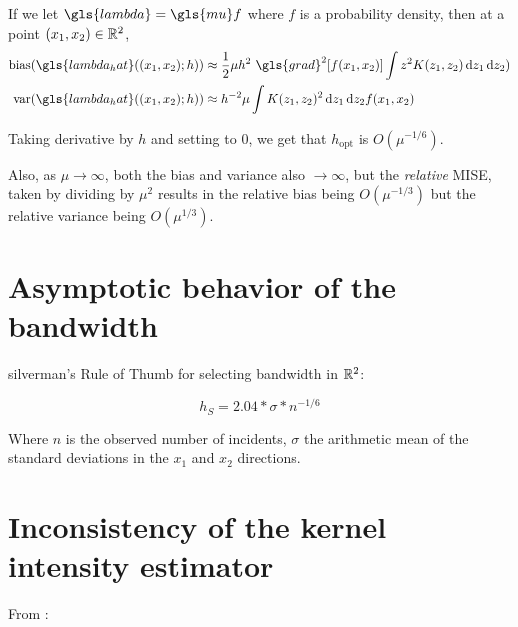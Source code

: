 If we let $\gls{lambda} = \gls{mu} f$ where $f$ is a probability density, then at a point $(x_1, x_2) \in \mathbb{R}^2$,
\begin{align}
    \mbox{bias}(\gls{lambda_hat}(\xvec;h)) & \approx
        \frac{1}{2} \mu h^2 ~ \gls{grad}^2\!\left[ f\xvec \right]
            \int { z^2 K(z_1, z_2) \diff{z_1} \diff{z_2)} } \\
    \mbox{var}(\gls{lambda_hat}(\xvec;h)) & \approx
        h^{-2} \mu
            \int { K(z_1, z_2)^2\diff{z_1} \diff{z_2} } f\xvec
\end{align}

Taking derivative by $h$ and setting to $0$, we get that $h_{\mbox{opt}}$ is $O(\mu^{-1/6})$.

Also, as $\mu \to \infty$, both the bias and variance also $\to \infty$,
but the \textit{relative} MISE, taken by dividing by $\mu^2$ results in the relative bias being $O(\mu^{-1/3})$
but the relative variance being $O(\mu^{1/3})$.

\section{Asymptotic behavior of the bandwidth}
\label{sec:theory:asymptotic_bandwidth}

\Gls{silverman}'s Rule of Thumb for selecting bandwidth in $\mathbb{R}^2$:

\begin{equation}
\label{eq:silverman}
    h_S = 2.04 * \sigma * n^{-1/6}
\end{equation}

Where $n$ is the observed number of incidents,
$\sigma$ the arithmetic mean of the standard deviations in the $x_1$ and $x_2$ directions.



\section{Inconsistency of the kernel intensity estimator}
\label{sec:theory:inconsistency}

From \citet{guan2008consistent}:


